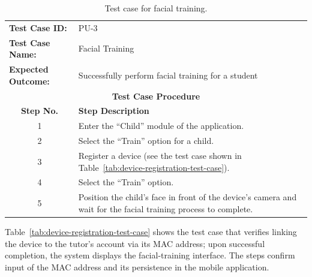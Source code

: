                 \begin{table}[!htbp]
                    \centering
                    \caption{Test case for facial training.}
                    \label{tab:face-training-test-case}
                    \begin{tabularx}{\textwidth}{l X}
                        \toprule
                        \textbf{Test Case ID:} & PU-3 \\
                        \textbf{Test Case Name:} & Facial Training \\
                        \textbf{Expected Outcome:} & Successfully perform facial training for a student \\
                        \midrule
                        \multicolumn{2}{c}{\textbf{Test Case Procedure}} \\
                        \midrule
                        \multicolumn{1}{c}{\textbf{Step No.}} & \textbf{Step Description} \\
                        \midrule
                        \multicolumn{1}{c}{1} & Enter the ``Child'' module of the application. \\
                        \multicolumn{1}{c}{2} & Select the ``Train'' option for a child. \\
                        \multicolumn{1}{c}{3} & Register a device (see the test case shown in Table~\ref{tab:device-registration-test-case}). \\
                        \multicolumn{1}{c}{4} & Select the ``Train'' option. \\
                        \multicolumn{1}{c}{5} & Position the child’s face in front of the device’s camera and wait for the facial training process to complete. \\
                        \bottomrule
                    \end{tabularx}
                \end{table}                
                
                Table~\ref{tab:device-registration-test-case} shows the test case that verifies linking the device to the tutor’s account via its MAC address; upon successful completion, the system displays the facial-training interface. The steps confirm input of the MAC address and its persistence in the mobile application.
                
